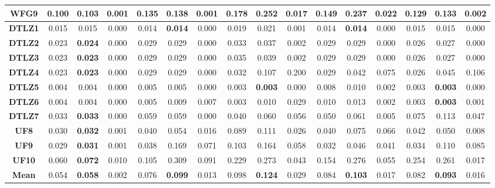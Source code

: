 \begin{table*}[t]
{\begin{tabular}{c|c|c|c|c|c|c|c|c|c|c|c|c|c|c|c|}
\multicolumn{1}{|c|}{\textbf{WFG9}} & 0.100 & \textbf{0.103} & 0.001 & 0.135 & 0.138 & 0.001 & 0.178 & 0.252 & 0.017 & 0.149 & 0.237 & 0.022 & 0.129 & 0.133 & 0.002 \\ \hline
\multicolumn{1}{|c|}{\textbf{DTLZ1}} & 0.015 & 0.015 & 0.000 & 0.014 & \textbf{0.014} & 0.000 & 0.019 & 0.021 & 0.001 & 0.014 & \textbf{0.014} & 0.000 & 0.015 & 0.015 & 0.000 \\ \hline
\multicolumn{1}{|c|}{\textbf{DTLZ2}} & 0.023 & \textbf{0.024} & 0.000 & 0.029 & 0.029 & 0.000 & 0.033 & 0.037 & 0.002 & 0.029 & 0.029 & 0.000 & 0.026 & 0.027 & 0.000 \\ \hline
\multicolumn{1}{|c|}{\textbf{DTLZ3}} & 0.023 & \textbf{0.023} & 0.000 & 0.029 & 0.029 & 0.000 & 0.035 & 0.039 & 0.002 & 0.029 & 0.029 & 0.000 & 0.026 & 0.027 & 0.000 \\ \hline
\multicolumn{1}{|c|}{\textbf{DTLZ4}} & 0.023 & \textbf{0.023} & 0.000 & 0.029 & 0.029 & 0.000 & 0.032 & 0.107 & 0.200 & 0.029 & 0.042 & 0.075 & 0.026 & 0.045 & 0.106 \\ \hline
\multicolumn{1}{|c|}{\textbf{DTLZ5}} & 0.004 & 0.004 & 0.000 & 0.005 & 0.005 & 0.000 & 0.003 & \textbf{0.003} & 0.000 & 0.008 & 0.010 & 0.002 & 0.003 & \textbf{0.003} & 0.000 \\ \hline
\multicolumn{1}{|c|}{\textbf{DTLZ6}} & 0.004 & 0.004 & 0.000 & 0.005 & 0.009 & 0.007 & 0.003 & 0.010 & 0.029 & 0.010 & 0.013 & 0.002 & 0.003 & \textbf{0.003} & 0.001 \\ \hline
\multicolumn{1}{|c|}{\textbf{DTLZ7}} & 0.033 & \textbf{0.033} & 0.000 & 0.059 & 0.059 & 0.000 & 0.040 & 0.060 & 0.056 & 0.050 & 0.061 & 0.005 & 0.075 & 0.113 & 0.047 \\ \hline
\multicolumn{1}{|c|}{\textbf{UF8}} & 0.030 & \textbf{0.032} & 0.001 & 0.040 & 0.054 & 0.016 & 0.089 & 0.111 & 0.026 & 0.040 & 0.075 & 0.066 & 0.042 & 0.050 & 0.008 \\ \hline
\multicolumn{1}{|c|}{\textbf{UF9}} & 0.029 & \textbf{0.031} & 0.001 & 0.038 & 0.169 & 0.071 & 0.103 & 0.164 & 0.058 & 0.032 & 0.046 & 0.041 & 0.034 & 0.110 & 0.085 \\ \hline
\multicolumn{1}{|c|}{\textbf{UF10}} & 0.060 & \textbf{0.072} & 0.010 & 0.105 & 0.309 & 0.091 & 0.229 & 0.273 & 0.043 & 0.154 & 0.276 & 0.055 & 0.254 & 0.261 & 0.017 \\ \hline
\multicolumn{1}{|c|}{\textbf{Mean}} & 0.054 & \textbf{0.058} & 0.002 & 0.076 & \textbf{0.099} & 0.013 & 0.098 & \textbf{0.124} & 0.029 & 0.084 & \textbf{0.103} & 0.017 & 0.082 & \textbf{0.093} & 0.016 \\ \hline
\end{tabular}%
}
\end{table*}


